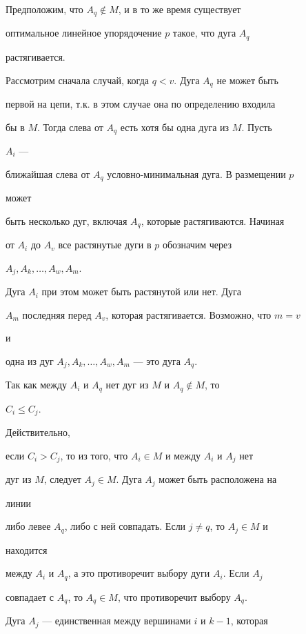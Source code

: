 \begin{pf} Предположим, что $A_q\notin M$, и в то же время существует


оптимальное линейное упорядочение $p$ такое, что дуга $A_q$


растягивается.





Рассмотрим сначала случай, когда $q<v$. Дуга $A_q$ не может быть


первой на цепи, т.к. в этом случае она по определению входила


бы в $M$. Тогда слева от $A_q$ есть хотя бы одна дуга из $M$. Пусть


$A_i$ ---


ближайшая слева от $A_q$ условно-минимальная дуга. В размещении $p$


может


быть несколько дуг, включая $A_q$, которые растягиваются. Начиная


от $A_i$ до $A_v$ все растянутые дуги в $p$ обозначим через


$A_j,A_k,\dotsc,A_w,A_m$.


Дуга $A_i$ при этом может быть растянутой или нет. Дуга


$A_m$ последняя перед $A_v$, которая растягивается. Возможно, что $m=v$


и


одна из дуг $A_j,A_k,\dotsc,A_w,A_m$ --- это дуга $A_q$.





Так как между $A_i$ и $A_q$ нет дуг из $M$ и $A_q\notin M$, то


$C_i\le C_j$.


Действительно,


если $C_i>C_j$, то из того, что $A_i\in M$ и между $A_i$ и $A_j$ нет


дуг из $M$, следует $A_j\in M$. Дуга $A_j$ может быть расположена на


линии


либо левее $A_q$, либо с ней совпадать. Если $j\ne q$, то $A_j\in M$ и


находится


между $A_i$ и $A_q$, а это противоречит выбору дуги $A_i$. Если $A_j$


совпадает с $A_q$, то $A_q\in M$, что противоречит выбору $A_q$.





Дуга $A_j$ --- единственная между вершинами $i$ и $k-1$, которая



\end{pf}
